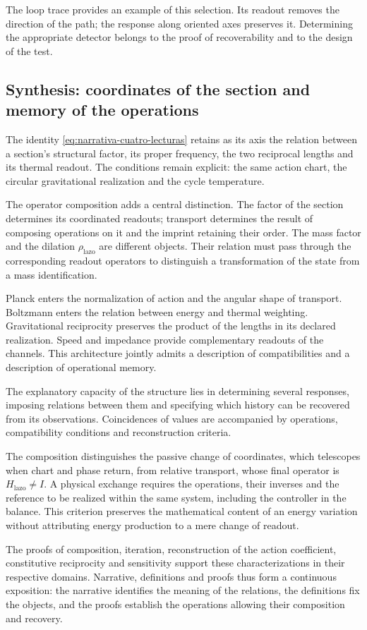 The loop trace provides an example of this selection. Its readout
removes the direction of the path; the response along oriented axes
preserves it. Determining the appropriate detector belongs to
the proof of recoverability and to the design of the test.

\subsection{Synthesis: coordinates of the section and memory of the operations}
\label{subsec:narrativa-sintesis}

The identity \eqref{eq:narrativa-cuatro-lecturas} retains as its axis
the relation between a section's structural factor, its proper
frequency, the two reciprocal lengths and its thermal readout. The
conditions remain explicit: the same action chart, the circular
gravitational realization and the cycle temperature.

The operator composition adds a central distinction. The factor
of the section determines its coordinated readouts; transport
determines the result of composing operations on it and the
imprint retaining their order. The mass factor and the dilation
$\rho_{\mathrm{lazo}}$ are different objects. Their relation must
pass through the corresponding readout operators to distinguish a
transformation of the state from a mass identification.

Planck enters the normalization of action and the angular
shape of transport. Boltzmann enters the relation between
energy and thermal weighting. Gravitational reciprocity preserves
the product of the lengths in its declared realization. Speed
and impedance provide complementary readouts of the channels.
This architecture jointly admits a description of
compatibilities and a description of operational memory.

The explanatory capacity of the structure lies in determining
several responses, imposing relations between them and specifying
which history can be recovered from its observations. Coincidences
of values are accompanied by operations,
compatibility conditions and reconstruction criteria.

The composition distinguishes the passive change of coordinates, which
telescopes when chart and phase return, from relative transport,
whose final operator is $H_{\mathrm{lazo}}\ne I$. A physical
exchange requires the operations, their inverses and the
reference to be realized within the same system, including the controller
in the balance. This criterion preserves the mathematical content
of an energy variation without attributing energy production
to a mere change of readout.

The proofs of composition, iteration, reconstruction of the action
coefficient, constitutive reciprocity and sensitivity support
these characterizations in their respective domains. Narrative,
definitions and proofs thus form a continuous exposition:
the narrative identifies the meaning of the relations, the
definitions fix the objects, and the proofs establish the
operations allowing their composition and recovery.
